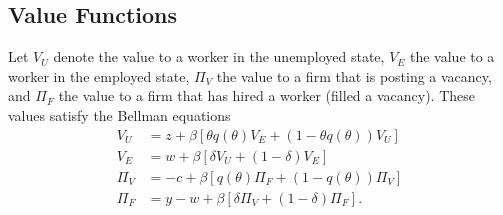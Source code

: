 \documentclass[11pt]{article}
\begin{document}
\subsection{Value Functions}
\label{sec:orga1d4714}
Let \(V_U\) denote the value to a worker in the unemployed state, \(V_E\) the value to a worker in the employed state, \(\Pi_V\) the value to a firm that is posting a vacancy, and \(\Pi_F\) the value to a firm that has hired a worker (filled a vacancy). These values satisfy the Bellman equations
\begin{align}
V_U &= z + \beta [\theta q(\theta) V_E + (1 - \theta q(\theta))V_U]\\
V_E &= w + \beta [\delta V_U + (1 - \delta)V_E]\\
\Pi_V &= -c + \beta [q(\theta) \Pi_F + (1 - q(\theta))\Pi_V]\\
\Pi_F &= y - w + \beta[\delta \Pi_V + (1 - \delta) \Pi_F].
\end{align}
\end{document}
